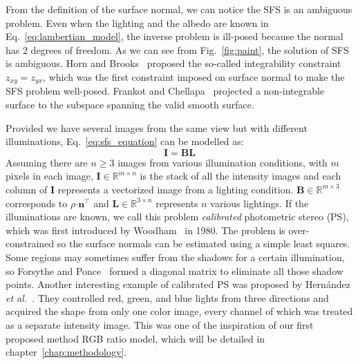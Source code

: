 From the definition of the surface normal, we can notice the SFS is an ambiguous problem. 
Even when the lighting and the albedo are known in Eq.~\ref{eq:lambertian_model}, the inverse problem is ill-posed because the normal has 2 degrees of freedom. 
As we can see from Fig.~\ref{fig:paint}, the solution of SFS is ambiguous.
Horn and Brooks~\cite{horn1986variational} proposed the so-called integrability constraint $z_{xy} = z_{yx}$, which was the first constraint imposed on surface normal to make the SFS problem well-posed. 
Frankot and Chellapa~\cite{frankot1988method} projected a non-integrable surface to the subspace spanning the valid smooth surface.


Provided we have several images from the same view but with different illuminations, Eq.~\ref{eq:sfs_equation} can be modelled as:
\begin{equation}\label{eq:ps_equation}
    \mathbf{I = BL}
\end{equation}
Assuming there are $n \geqslant 3$ images from various illumination conditions, with $m$ pixels in each image, $\mathbf{I}\in \mathbb{R}^{m\times n}$ is the stack of all the intensity images and each column of $\mathbf{I}$ represents a vectorized image from a lighting condition.
 $\mathbf{B}\in\mathbb{R}^{m\times3}$ corresponds to $\rho \boldsymbol{\cdot} \mathbf{n}^\top$ and $\mathbf{L}\in\mathbb{R}^{3\times n}$ represents $ n$ various lightings.
If the illuminations are known, we call this problem \emph{calibrated} photometric stereo (PS), which was first introduced by Woodham~\cite{woodham1980photometric} in 1980. The problem is over-constrained so the surface normals can be estimated using a simple least squares. 
Some regions may sometimes suffer from the shadows for a certain illumination, so Forsythe and Ponce~\cite{forsyth2003modern} formed a diagonal matrix to eliminate all those shadow points.
Another interesting example of calibrated PS was proposed by Hern{\'a}ndez \emph{et al.}~\cite{hernandez2011overcoming}.
They controlled red, green, and blue lights from three directions and acquired the shape from only one color image, every channel of which was treated as a separate intensity image.   
This was one of the inspiration of our first proposed method RGB ratio model, which will be detailed in chapter~\ref{chap:methodology}.

